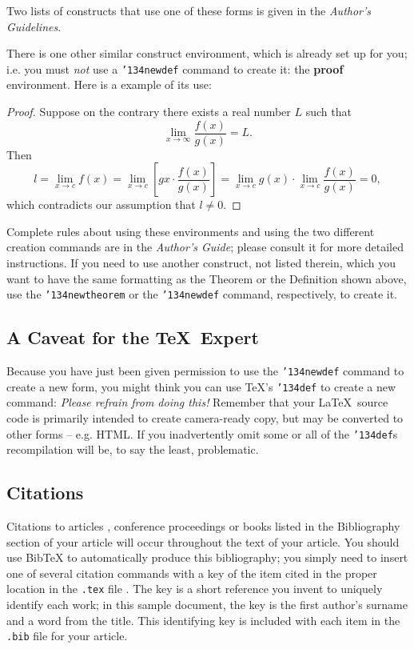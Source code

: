 \documentclass{nime-alternate}
\begin{document}
Two lists of constructs that use one of these
forms is given in the
\textit{Author's  Guidelines}.
 
There is one other similar construct environment, which is
already set up
for you; i.e. you must \textit{not} use
a \texttt{{\char'134}newdef} command to
create it: the \textbf{proof} environment.  Here
is a example of its use:
\begin{proof}
Suppose on the contrary there exists a real number $L$ such that
\begin{displaymath}
\lim_{x\rightarrow\infty} \frac{f(x)}{g(x)} = L.
\end{displaymath}
Then
\begin{displaymath}
l=\lim_{x\rightarrow c} f(x)
= \lim_{x\rightarrow c}
\left[ g{x} \cdot \frac{f(x)}{g(x)} \right ]
= \lim_{x\rightarrow c} g(x) \cdot \lim_{x\rightarrow c}
\frac{f(x)}{g(x)} = 0,
\end{displaymath}
which contradicts our assumption that $l\neq 0$.
\end{proof}

Complete rules about using these environments and using the
two different creation commands are in the
\textit{Author's Guide}; please consult it for more
detailed instructions.  If you need to use another construct,
not listed therein, which you want to have the same
formatting as the Theorem
or the Definition \cite{salas:calculus} shown above,
use the \texttt{{\char'134}newtheorem} or the
\texttt{{\char'134}newdef} command,
respectively, to create it.

\subsection{A {\secit Caveat} for the \TeX\ Expert}
Because you have just been given permission to
use the \texttt{{\char'134}newdef} command to create a
new form, you might think you can
use \TeX's \texttt{{\char'134}def} to create a
new command: \textit{Please refrain from doing this!}
Remember that your \LaTeX\ source code is primarily intended
to create camera-ready copy, but may be converted
to other forms -- e.g. HTML. If you inadvertently omit
some or all of the \texttt{{\char'134}def}s recompilation will
be, to say the least, problematic.



\subsection{Citations}
Citations to articles \cite{bowman:reasoning,
clark:pct, braams:babel, herlihy:methodology},
conference proceedings \cite{clark:pct} or
books \cite{salas:calculus, Lamport:LaTeX} listed
in the Bibliography section of your
article will occur throughout the text of your article.
You should use BibTeX to automatically produce this bibliography;
you simply need to insert one of several citation commands with
a key of the item cited in the proper location in
the \texttt{.tex} file \cite{Lamport:LaTeX}.
The key is a short reference you invent to uniquely
identify each work; in this sample document, the key is
the first author's surname and a
word from the title.  This identifying key is included
with each item in the \texttt{.bib} file for your article.
\end{document}
